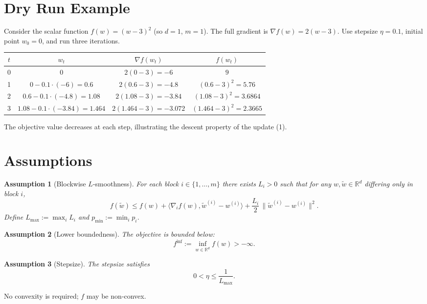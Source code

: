\documentclass{article}
\newtheorem{assumption}{Assumption}
\newcommand{\R}{\mathbb{R}}
\begin{document}
\section*{Dry Run Example}
Consider the scalar function $f(w)=(w-3)^2$ (so $d=1$, $m=1$).  
The full gradient is $\nabla f(w)=2(w-3)$.  Use stepsize $\eta=0.1$,
initial point $w_0=0$, and run three iterations.

\begin{center}
\begin{tabular}{c|c|c|c}
$t$ & $w_t$ & $\nabla f(w_t)$ & $f(w_t)$\\ \hline
0 & $0$ & $2(0-3)=-6$ & $9$\\
1 & $0-0.1\cdot(-6)=0.6$ & $2(0.6-3)=-4.8$ & $(0.6-3)^2=5.76$\\
2 & $0.6-0.1\cdot(-4.8)=1.08$ & $2(1.08-3)=-3.84$ & $(1.08-3)^2=3.6864$\\
3 & $1.08-0.1\cdot(-3.84)=1.464$ & $2(1.464-3)=-3.072$ & $(1.464-3)^2=2.3665$
\end{tabular}
\end{center}
The objective value decreases at each step, illustrating the descent
property of the update (1).

\newpage

\section*{Assumptions}
\begin{assumption}[Blockwise $L$‑smoothness]\label{ass:smooth}
For each block $i\in\{1,\dots,m\}$ there exists $L_i>0$ such that for any
$w,\tilde w\in\R^{d}$ differing only in block $i$,
\[
f(\tilde w)\le f(w)+\langle \nabla_i f(w),\tilde w^{(i)}-w^{(i)}\rangle
+\frac{L_i}{2}\,\|\tilde w^{(i)}-w^{(i)}\|^{2}.
\tag{2}
\]
Define $L_{\max}:=\max_i L_i$ and $p_{\min}:=\min_i p_i$.
\end{assumption}

\begin{assumption}[Lower boundedness]\label{ass:bound}
The objective is bounded below:
\[
f^{\inf}:=\inf_{w\in\R^{d}} f(w) > -\infty .
\]
\end{assumption}

\begin{assumption}[Stepsize]\label{ass:step}
The stepsize satisfies
\[
0<\eta\le \frac{1}{L_{\max}} .
\tag{3}
\]
\end{assumption}

No convexity is required; $f$ may be non‑convex.
\end{document}
